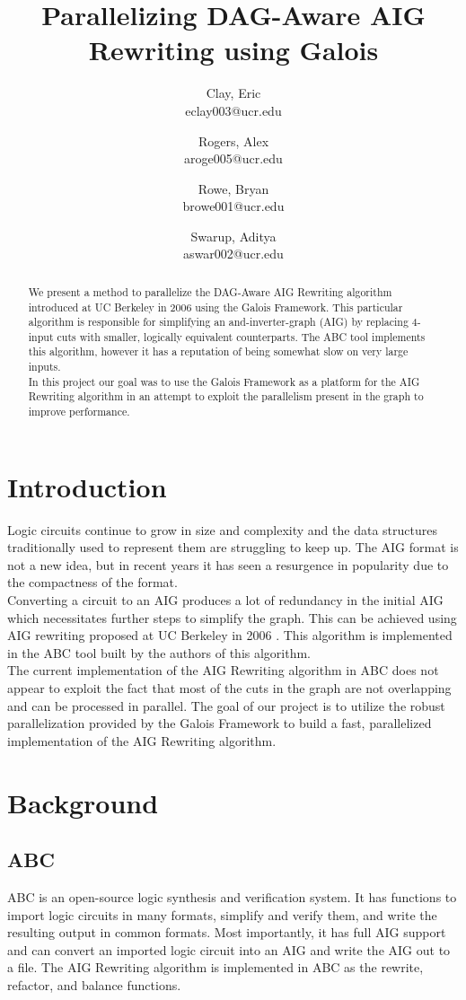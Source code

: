 \documentclass[twocolumn]{article}
\title{\huge{Parallelizing DAG-Aware AIG Rewriting using Galois}}
\date{\vspace{-5ex}}
\author{
  Clay, Eric\\
  eclay003@ucr.edu
  \and
  Rogers, Alex\\
  aroge005@ucr.edu
  \and
  Rowe, Bryan\\
  browe001@ucr.edu
  \and
  Swarup, Aditya\\
  aswar002@ucr.edu
}
\begin{document}
\maketitle

\begin{abstract}
We present a method to parallelize the DAG-Aware AIG Rewriting algorithm introduced at UC Berkeley in 2006 \cite{DAG} using the Galois Framework\cite{GALOIS}.  This particular algorithm is responsible for simplifying an and-inverter-graph (AIG) by replacing 4-input cuts with smaller, logically equivalent counterparts.  The ABC\cite{DAG} tool implements this algorithm, however it has a reputation of being somewhat slow on very large inputs.\\\indent
In this project our goal was to use the Galois Framework\cite{GALOIS} as a platform for the AIG Rewriting algorithm in an attempt to exploit the parallelism present in the graph to improve performance.
\end{abstract}

\section{Introduction}
Logic circuits continue to grow in size and complexity and the data structures traditionally used to represent them are struggling to keep up. The AIG format is not a new idea, but in recent years it has seen a resurgence in popularity due to the compactness of the format.\\\indent
Converting a circuit to an AIG produces a lot of redundancy in the initial AIG which necessitates further steps to simplify the graph. This can be achieved using AIG rewriting proposed at UC Berkeley in 2006 \cite{DAG}.  This algorithm is implemented in the ABC tool built by the authors of this algorithm.\\\indent
The current implementation of the AIG Rewriting algorithm in ABC does not appear to exploit the fact that most of the cuts in the graph are not overlapping and can be processed in parallel.  The goal of our project is to utilize the robust parallelization provided by the Galois Framework\cite{GALOIS} to build a fast, parallelized implementation of the AIG Rewriting algorithm.

\section{Background}
\subsection{ABC}
ABC is an open-source logic synthesis and verification system. It has functions to import logic circuits in many formats, simplify and verify them, and write the resulting output in common formats.  Most importantly, it has full AIG support and can convert an imported logic circuit into an AIG and write the AIG out to a file.  The AIG Rewriting algorithm is implemented in ABC as the rewrite, refactor, and balance functions.
\end{document}
